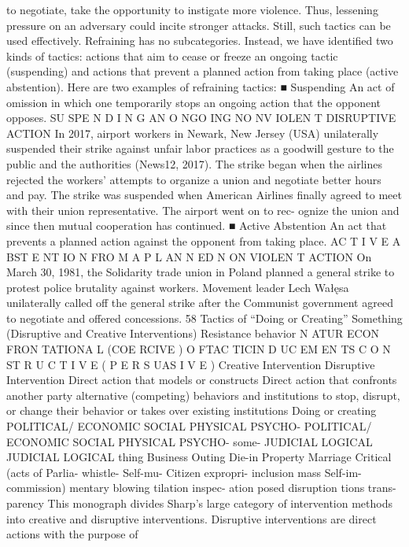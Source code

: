 \documentclass[twoside,a4paper,12pt,fleqn,openany]{extbook}
\begin{document}
to negotiate, take the opportunity to instigate more violence. Thus, lessening pressure on
an adversary could incite stronger attacks. Still, such tactics can be used effectively.
Refraining has no subcategories. Instead, we have identified two kinds of tactics: actions
that aim to cease or freeze an ongoing tactic (suspending) and actions that prevent a planned
action from taking place (active abstention). Here are two examples of refraining tactics:
■ Suspending
An act of omission in which one temporarily stops an ongoing action that the opponent
opposes.
SU SPE N D I N G AN O NGO ING NO NV IOLEN T DISRUPTIVE ACTION
In 2017, airport workers in Newark, New Jersey (USA) unilaterally suspended their strike
against unfair labor practices as a goodwill gesture to the public and the authorities (News12,
2017). The strike began when the airlines rejected the workers’ attempts to organize a
union and negotiate better hours and pay. The strike was suspended when American
Airlines finally agreed to meet with their union representative. The airport went on to rec-
ognize the union and since then mutual cooperation has continued.
■ Active Abstention
An act that prevents a planned action against the opponent from taking place.
AC T I V E A BST E NT IO N FRO M A P L AN N ED N ON VIOLEN T ACTION
On March 30, 1981, the Solidarity trade union in Poland planned a general strike to protest
police brutality against workers. Movement leader Lech Wałęsa unilaterally called off the
general strike after the Communist government agreed to negotiate and offered
concessions.
58
Tactics of “Doing or Creating” Something (Disruptive and Creative Interventions)
Resistance
behavior
N ATUR ECON FRON TATIONA L
(COE RCIVE )
O FTAC TICIN D UC EM EN TS
C O N ST R U C T I V E
( P E R S UAS I V E )
Creative Intervention
Disruptive Intervention
Direct action that models or constructs
Direct action that confronts another party
alternative (competing) behaviors and institutions
to stop, disrupt, or change their behavior
or takes over existing institutions
Doing or
creating
POLITICAL/
 ECONOMIC
 SOCIAL
 PHYSICAL
 PSYCHO-
 POLITICAL/
 ECONOMIC
 SOCIAL
 PHYSICAL
 PSYCHO-
some-
 JUDICIAL
 LOGICAL
 JUDICIAL
 LOGICAL
thing
 Business
 Outing
 Die-in
 Property
 Marriage
 Critical
(acts of
 Parlia-
 whistle-
 Self-mu-
 Citizen
 expropri-
 inclusion
 mass
 Self-im-
commission)
 mentary
 blowing
 tilation
 inspec-
 ation
 posed
disruption
 tions
 trans-
parency
This monograph divides Sharp’s large category of intervention methods into creative and
disruptive interventions. Disruptive interventions are direct actions with the purpose of
\end{document}
